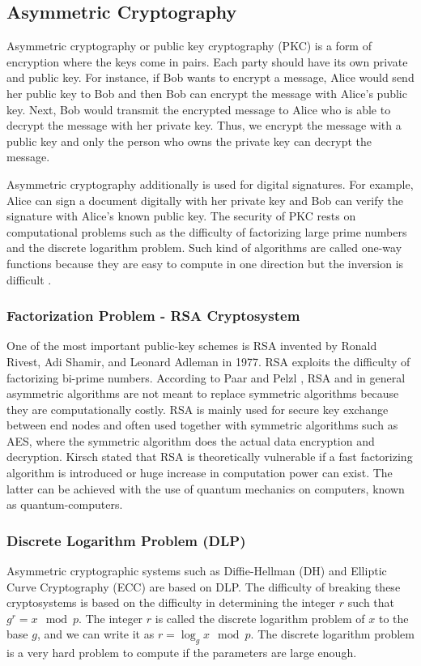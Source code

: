 \documentclass[conference, letterpaper]{IEEEtran}
\begin{document}
\subsection{Asymmetric Cryptography}
Asymmetric cryptography or public key cryptography (PKC) is a form of encryption where the keys come in pairs. Each party should have its own private and public key. For instance, if Bob wants to encrypt a message, Alice would send her public key to Bob and then Bob can encrypt the message with Alice’s public key. Next, Bob would transmit the encrypted message to Alice who is able to decrypt the message with her private key. Thus, we encrypt the message with a public key and only the person who owns the private key can decrypt the message.

Asymmetric cryptography additionally is used for digital signatures. For example, Alice can sign a document digitally with her private key and Bob can verify the signature with Alice's known public key.
The security of PKC rests on computational problems such as the difficulty of factorizing large prime numbers and the discrete logarithm problem. Such kind of algorithms are called one-way functions because they are easy to compute in one direction but the inversion is difficult \cite{Dusek2006381}. 

\subsubsection{Factorization Problem - RSA Cryptosystem}

One of the most important public-key schemes is RSA invented by Ronald Rivest, Adi Shamir, and Leonard Adleman in 1977. RSA exploits the difficulty of factorizing bi-prime numbers. According to Paar and Pelzl \cite{Paar2010}, RSA and in general asymmetric algorithms are not meant to replace symmetric algorithms because they are computationally costly. RSA is mainly used for secure key exchange between end nodes and often used together with symmetric algorithms such as AES, where the symmetric algorithm does the actual data encryption and decryption. Kirsch \cite{Kirsch2015} stated that RSA is theoretically vulnerable if a fast factorizing algorithm is introduced or huge increase in computation power can exist. The latter can be achieved with the use of quantum mechanics on computers, known as quantum-computers.  

\subsubsection{Discrete Logarithm Problem (DLP)}
Asymmetric cryptographic systems such as Diffie-Hellman (DH) and Elliptic Curve Cryptography (ECC) are based on DLP. The difficulty of breaking these cryptosystems is based on the difficulty in determining the integer $r$ such that $g^{r} = x\mod p$. The integer $r$ is called the discrete logarithm problem of $x$ to the base $g$, and we can write it as $r = \log_{g} x\mod p$. The discrete logarithm problem is a very hard problem to compute if the parameters are large enough. 
\end{document}
